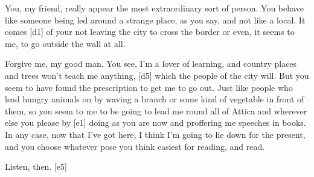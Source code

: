  You, my friend, really appear the most
extraordinary sort of
person. You behave like someone being led around a strange place, as you
say, and not like a local. It comes {[}d1{]} of your not leaving the
city to cross the border or even, it seems to me, to go outside the wall
at all.

 Forgive me, my good man. You see, I'm a lover of learning, and
country places and trees won't teach me anything, {[}d5{]} which the
people of the city will.
But you seem to have found the
prescription to get me to
go out. Just like people who lead hungry animals on by waving a branch
or some kind of vegetable in front of them, so you seem to me to be
going to lead me round all of Attica and wherever else you please by
{[}e1{]} doing as you are now and proffering me speeches in
books. In any case, now
that I've got here, I think I'm going to lie down for the present, and
you choose whatever pose you think easiest for reading, and read.

 Listen, then.
{[}e5{]}

